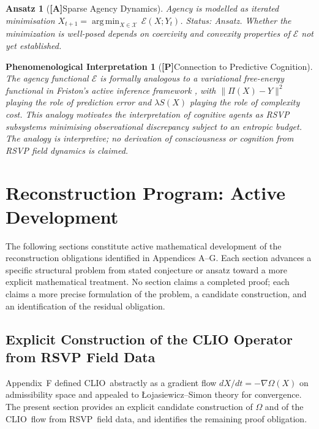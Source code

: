 \documentclass[12pt,a4paper]{article}
\DeclareMathOperator*{\argmin}{arg\,min}
\newcommand{\claimA}{\textbf{[A]}\;}
\newcommand{\claimP}{\textbf{[P]}\;}
\newtheorem{appansatz}[defn]{Ansatz}
\newtheorem{appphen}[defn]{Phenomenological Interpretation}
\newcommand{\RSVP}{\textrm{RSVP}}
\newcommand{\CLIO}{\textrm{CLIO}}
\begin{document}
\begin{appansatz}[\claimA Sparse Agency Dynamics]
Agency is modelled as iterated minimisation
$X_{t+1} = \argmin_{X\in\mathcal{X}}\,\mathcal{E}(X;Y_t)$.
\emph{Status: Ansatz.} Whether the minimization is well-posed depends on
coercivity and convexity properties of $\mathcal{E}$ not yet established.
\end{appansatz}

\begin{appphen}[\claimP Connection to Predictive Cognition]
The agency functional $\mathcal{E}$ is formally analogous to a variational
free-energy functional in Friston's active inference framework
\cite{Friston2010}, with $\|\Pi(X)-Y\|^2$ playing the role of prediction error
and $\lambda S(X)$ playing the role of complexity cost. This analogy motivates
the interpretation of cognitive agents as RSVP subsystems minimising
observational discrepancy subject to an entropic budget. The analogy is
interpretive; no derivation of consciousness or cognition from RSVP field
dynamics is claimed.
\end{appphen}

\section{Reconstruction Program: Active Development}

The following sections constitute active mathematical development of the
reconstruction obligations identified in Appendices A--G. Each section
advances a specific structural problem from stated conjecture or ansatz toward
a more explicit mathematical treatment. No section claims a completed proof;
each claims a more precise formulation of the problem, a candidate construction,
and an identification of the residual obligation.

\subsection{Explicit Construction of the CLIO Operator from RSVP Field Data}

Appendix~F defined \CLIO\ abstractly as a gradient flow $dX/dt=-\nabla\Omega(X)$
on admissibility space and appealed to Łojasiewicz--Simon theory for convergence.
The present section provides an explicit candidate construction of $\Omega$ and
of the \CLIO\ flow from \RSVP\ field data, and identifies the remaining proof
obligation.
\end{document}
